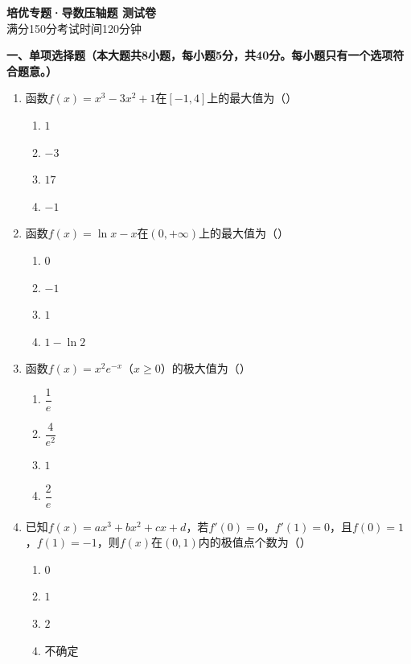 \documentclass[12pt, a4paper]{ctexart}
\begin{document}
\begin{center}
{\Large\bfseries 培优专题·导数压轴题 测试卷}\\[0.5em]
{\normalsize 满分150分\quad 考试时间120分钟}
\end{center}

\vspace{0.5em}

\noindent\textbf{一、单项选择题（本大题共8小题，每小题5分，共40分。每小题只有一个选项符合题意。）}

\begin{enumerate}[label=\Alph*.]

\item 函数$f(x)=x^3-3x^2+1$在$[-1,4]$上的最大值为（\quad）
\begin{enumerate}[label=]
\item $1$ \qquad \item $-3$ \qquad \item $17$ \qquad \item $-1$
\end{enumerate}

\item 函数$f(x)=\ln x-x$在$(0,+\infty)$上的最大值为（\quad）
\begin{enumerate}[label=]
\item $0$ \qquad \item $-1$ \qquad \item $1$ \qquad \item $1-\ln 2$
\end{enumerate}

\item 函数$f(x)=x^2e^{-x}$（$x\geq 0$）的极大值为（\quad）
\begin{enumerate}[label=]
\item $\dfrac{1}{e}$ \qquad \item $\dfrac{4}{e^2}$ \qquad \item $1$ \qquad \item $\dfrac{2}{e}$
\end{enumerate}

\item 已知$f(x)=ax^3+bx^2+cx+d$，若$f'(0)=0$，$f'(1)=0$，且$f(0)=1$，$f(1)=-1$，则$f(x)$在$(0,1)$内的极值点个数为（\quad）
\begin{enumerate}[label=]
\item $0$ \qquad \item $1$ \qquad \item $2$ \qquad \item 不确定
\end{enumerate}


\end{enumerate}
\end{document}

